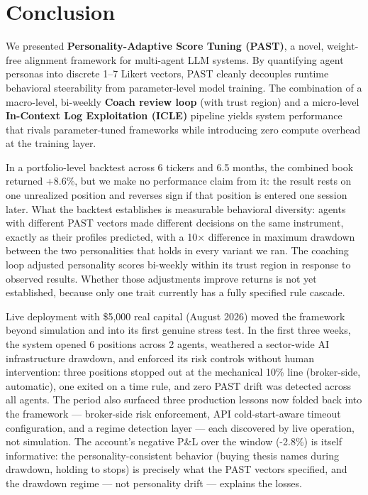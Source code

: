 \documentclass[11pt]{article}
\begin{document}
\section{Conclusion}\label{conclusion}

We presented \textbf{Personality-Adaptive Score Tuning (PAST)}, a novel, weight-free alignment framework for multi-agent LLM systems. By quantifying agent personas into discrete 1--7 Likert vectors, PAST cleanly decouples runtime behavioral steerability from parameter-level model training. The combination of a macro-level, bi-weekly \textbf{Coach review loop} (with trust region) and a micro-level \textbf{In-Context Log Exploitation (ICLE)} pipeline yields system performance that rivals parameter-tuned frameworks while introducing zero compute overhead at the training layer.

In a portfolio-level backtest across 6 tickers and 6.5 months, the combined book returned +8.6\%, but we make no performance claim from it: the result rests on one unrealized position and reverses sign if that position is entered one session later. What the backtest establishes is measurable behavioral diversity: agents with different PAST vectors made different decisions on the same instrument, exactly as their profiles predicted, with a 10× difference in maximum drawdown between the two personalities that holds in every variant we ran. The coaching loop adjusted personality scores bi-weekly within its trust region in response to observed results. Whether those adjustments improve returns is not yet established, because only one trait currently has a fully specified rule cascade.

Live deployment with \$5,000 real capital (August 2026) moved the framework beyond simulation and into its first genuine stress test. In the first three weeks, the system opened 6 positions across 2 agents, weathered a sector-wide AI infrastructure drawdown, and enforced its risk controls without human intervention: three positions stopped out at the mechanical 10\% line (broker-side, automatic), one exited on a time rule, and zero PAST drift was detected across all agents. The period also surfaced three production lessons now folded back into the framework --- broker-side risk enforcement, API cold-start-aware timeout configuration, and a regime detection layer --- each discovered by live operation, not simulation. The account's negative P\&L over the window (-2.8\%) is itself informative: the personality-consistent behavior (buying thesis names during drawdown, holding to stops) is precisely what the PAST vectors specified, and the drawdown regime --- not personality drift --- explains the losses.
\end{document}
